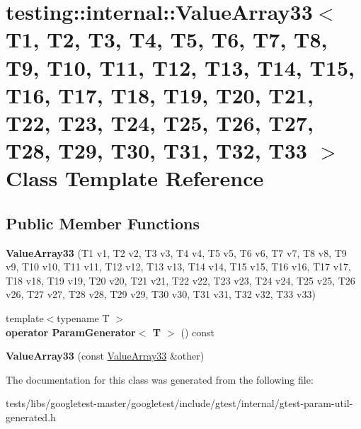 \hypertarget{classtesting_1_1internal_1_1ValueArray33}{}\section{testing\+:\+:internal\+:\+:Value\+Array33$<$ T1, T2, T3, T4, T5, T6, T7, T8, T9, T10, T11, T12, T13, T14, T15, T16, T17, T18, T19, T20, T21, T22, T23, T24, T25, T26, T27, T28, T29, T30, T31, T32, T33 $>$ Class Template Reference}
\label{classtesting_1_1internal_1_1ValueArray33}
\subsection*{Public Member Functions}
\begin{DoxyCompactItemize}
\item 
\mbox{\label{classtesting_1_1internal_1_1ValueArray33_a651446935b07a1e9186f053da55d9a43}} 
{\bfseries Value\+Array33} (T1 v1, T2 v2, T3 v3, T4 v4, T5 v5, T6 v6, T7 v7, T8 v8, T9 v9, T10 v10, T11 v11, T12 v12, T13 v13, T14 v14, T15 v15, T16 v16, T17 v17, T18 v18, T19 v19, T20 v20, T21 v21, T22 v22, T23 v23, T24 v24, T25 v25, T26 v26, T27 v27, T28 v28, T29 v29, T30 v30, T31 v31, T32 v32, T33 v33)
\item 
\mbox{\label{classtesting_1_1internal_1_1ValueArray33_adba3f5fe897de2c06eb6b5aa9965c7c0}} 
{\footnotesize template$<$typename T $>$ }\\{\bfseries operator Param\+Generator$<$ T $>$} () const
\item 
\mbox{\label{classtesting_1_1internal_1_1ValueArray33_a27fe430ae99bcd191f6a972ed239a5b0}} 
{\bfseries Value\+Array33} (const \hyperlink{classtesting_1_1internal_1_1ValueArray33}{Value\+Array33} \&other)
\end{DoxyCompactItemize}


The documentation for this class was generated from the following file\+:\begin{DoxyCompactItemize}
\item 
tests/libs/googletest-\/master/googletest/include/gtest/internal/gtest-\/param-\/util-\/generated.\+h\end{DoxyCompactItemize}
